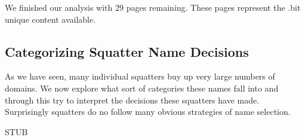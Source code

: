 We finished our analysis with 29 pages remaining. These pages represent the .bit unique content available.

\subsection{Categorizing Squatter Name Decisions}

As we have seen, many individual squatters buy up very large numbers of domains. We now explore what sort of categories these names fall into and through this try to interpret the decisions these squatters have made. Surprisingly squatters do no follow many obvious strategies of name selection.

STUB